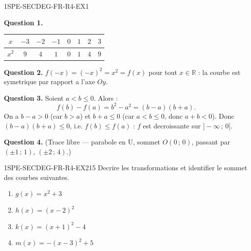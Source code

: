 \begin{corrige}{1SPE-SECDEG-FR-R4-EX1}

\textbf{Question 1.}

\begin{center}
\begin{tabular}{|c|c|c|c|c|c|c|c|}
\hline
$x$ & $-3$ & $-2$ & $-1$ & $0$ & $1$ & $2$ & $3$ \\
\hline
$x^2$ & $9$ & $4$ & $1$ & $0$ & $1$ & $4$ & $9$ \\
\hline
\end{tabular}
\end{center}

\textbf{Question 2.} $f(-x) = (-x)^2 = x^2 = f(x)$ pour tout $x \in \mathbb{R}$ : la courbe est symetrique par rapport a l'axe $Oy$.

\textbf{Question 3.} Soient $a < b \leq 0$. Alors :
\[
f(b) - f(a) = b^2 - a^2 = (b-a)(b+a).
\]
On a $b - a > 0$ (car $b > a$) et $b + a \leq 0$ (car $a < b \leq 0$, donc $a + b < 0$). Donc $(b-a)(b+a) \leq 0$, i.e. $f(b) \leq f(a)$ : $f$ est decroissante sur $]-\infty\,;\,0]$.

\textbf{Question 4.} (Trace libre — parabole en U, sommet $O(0\,;\,0)$, passant par $(\pm 1\,;\,1)$, $(\pm 2\,;\,4)$.)

\end{corrige}


\begin{exercice}{1SPE-SECDEG-FR-R4-EX2}{1}{5}
Decrire les transformations et identifier le sommet des courbes suivantes.
\begin{enumerate}
  \item $g(x) = x^2 + 3$
  \item $h(x) = (x-2)^2$
  \item $k(x) = (x+1)^2 - 4$
  \item $m(x) = -(x-3)^2 + 5$
\end{enumerate}
\end{exercice}


